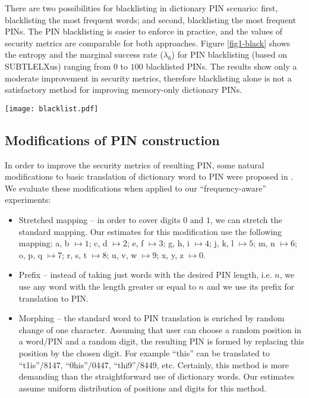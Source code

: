 \documentclass[a4paper, 11pt]{article}
\begin{document}
There are two possibilities for blacklisting in dictionary PIN scenario: first, blacklisting the most frequent 
words; and second, blacklisting the most frequent PINs. The PIN blacklisting is easier to enforce in practice,
and the values of security metrics are comparable for both approaches. Figure \ref{fig1-black} shows the entropy 
and the marginal success rate ($\lambda_6$) for PIN blacklisting (based on SUBTLELXus) ranging from $0$ to $100$
blacklisted PINs. The results show only a moderate improvement in security metrics, therefore blacklisting alone
is not a satisfactory method for improving memory-only dictionary PINs.

\begin{figure*}[h]\centering
\begin{center}\texttt{[image: blacklist.pdf]}\end{center}
\caption{The effect of PIN blacklisting on entropy and marginal success rate}\label{fig1-black}
\end{figure*}


\subsection{Modifications of PIN construction}

In order to improve the security metrics of resulting PIN, some natural modifications to basic translation
of dictionary word to PIN were proposed in \cite{SS13}. We evaluate these modifications when applied 
to our ``frequency-aware'' experiments:

\begin{itemize}
\renewcommand{\labelitemi}{$-$}
\item Stretched mapping -- in order to cover digits $0$ and $1$, we can stretch the standard mapping. 
  Our estimates for this modification use the following mapping: a, b $\mapsto 1$; c, d  $\mapsto 2$;
  e, f  $\mapsto 3$; g, h, i  $\mapsto 4$; j, k, l  $\mapsto 5$; m, n  $\mapsto 6$; o, p, q  $\mapsto 7$;
  r, s, t $\mapsto 8$; u, v, w $\mapsto 9$; x, y, z $\mapsto 0$.
\item Prefix -- instead of taking just words with the desired PIN length, i.e. $n$, we use any word with the
  length greater or equal to $n$ and we use its prefix for translation to PIN.
\item Morphing -- the standard word to PIN translation is enriched by random change of one character.
  Assuming that user can choose a random position in a word/PIN and a random digit, the resulting PIN
  is formed by replacing this position by the chosen digit. For example ``this'' can be translated to
  ``t1is''/8147, ``0his''/0447, ``thi9''/8449, etc. Certainly, this method is more demanding than the
  straightforward use of dictionary words. Our estimates assume uniform distribution of positions and
  digits for this method.
\end{itemize}
\end{document}
